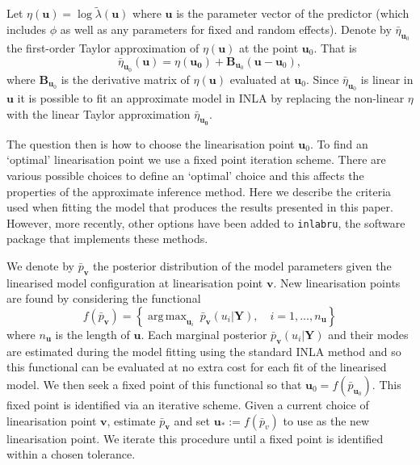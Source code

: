 \documentclass{stylefile16/statsoc}
\newcommand{\bm}{\boldsymbol}  %
\DeclareMathOperator*{\argmax}{arg\,max}  %
\begin{document}
Let $\eta(\bm{u}) = \log \tilde{\lambda}(\bm{u})$ where $\bm{u}$ is the parameter vector of the predictor (which includes $\phi$ as well as any parameters for fixed and random effects).  Denote by $\bar{\eta}_{\bm{u}_0}$ the first-order Taylor approximation of $\eta(\bm{u})$ at the point $\bm{u}_0$.  That is
\begin{equation*}
\bar{\eta}_{\bm{u}_0} (\bm{u}) = \eta(\bm{u_0}) + \bm{B}_{\bm{u}_0}(\bm{u} - \bm{u}_0),
\end{equation*}
where $\bm{B}_{\bm{u}_0}$ is the derivative matrix of $\eta(\bm{u})$ evaluated at $\bm{u}_0$.  Since $\bar{\eta}_{\bm{u}_0}$ is linear in $\bm{u}$ it is possible to fit an approximate model in INLA by replacing the non-linear $\eta$ with the linear Taylor approximation $\bar{\eta}_{\bm{u_0}}$.   

The question then is how to choose the linearisation point $\bm{u}_0$.  To find an `optimal' linearisation point we use a fixed point iteration scheme.  There are various possible choices to define an `optimal' choice and this affects the properties of the approximate inference method.  Here we describe the criteria used when fitting the model that produces the results presented in this paper.  However, more recently, other options have been added to \texttt{inlabru}, the software package that implements these methods.

We denote by $\bar{p}_{\bm{v}}$ the posterior distribution of the model parameters given the linearised model configuration at linearisation point $\bm{v}$.  New linearisation points are found by considering the functional
\begin{equation}
	f(\bar{p}_{\bm{v}}) = \left\{ \argmax_{\bm{u}_i} \: \bar{p}_{\bm{v}}(u_i | \bm{Y}), \quad i = 1, \ldots, n_{\bm{u}} \right\}
\end{equation}
where $n_{\bm{u}}$ is the length of $\bm{u}$.  Each marginal posterior $\bar{p}_{\bm{v}} (u_i | \bm{Y})$ and their modes are estimated during the model fitting using the standard INLA method and so this functional can be evaluated at no extra cost for each fit of the linearised model.
We then seek a fixed point of this functional so that $\bm{u}_0 = f(\bar{p}_{\bm{u}_0})$.  This fixed point is identified via an iterative scheme.  Given a current choice of linearisation point $\bm{v}$, estimate $\bar{p}_{\bm{v}}$ and set $\bm{u}_* :=f(\bar{p}_v)$ to use as the new linearisation point.  We iterate this procedure until a fixed point is identified within a chosen tolerance.
\end{document}

